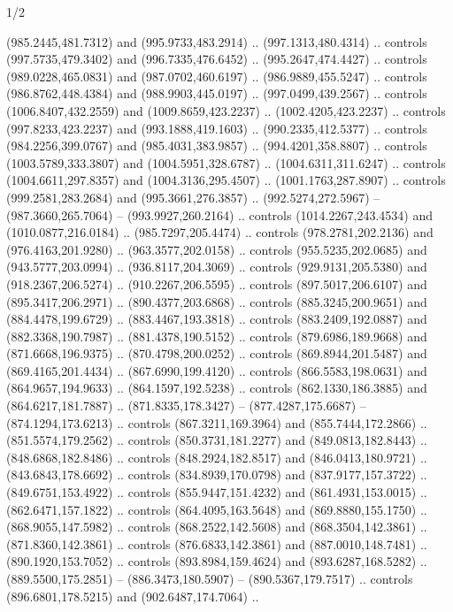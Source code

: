 \begin{flagdescription}{1/2}
\begin{scope}[shift={(2*\flaglength/3-0.25*\rb,0.51333\flagwidth)},scale=0.001715\flagwidth*\stretchfactor]
\begin{scope}[y=-1pt, x=1pt,cm={{1.04354,0.0,0.0,1.01818,(-827,-297)}}]
\begin{scope}[draw=black,line width=0.015\flagwidth]
\begin{scope}[fill=gold]
  (985.2445,481.7312) and (995.9733,483.2914) .. (997.1313,480.4314) .. controls
  (997.5735,479.3402) and (996.7335,476.6452) .. (995.2647,474.4427) .. controls
  (989.0228,465.0831) and (987.0702,460.6197) .. (986.9889,455.5247) .. controls
  (986.8762,448.4384) and (988.9903,445.0197) .. (997.0499,439.2567) .. controls
  (1006.8407,432.2559) and (1009.8659,423.2237) .. (1002.4205,423.2237) ..
  controls (997.8233,423.2237) and (993.1888,419.1603) .. (990.2335,412.5377) ..
  controls (984.2256,399.0767) and (985.4031,383.9857) .. (994.4201,358.8807) ..
  controls (1003.5789,333.3807) and (1004.5951,328.6787) .. (1004.6311,311.6247)
  .. controls (1004.6611,297.8357) and (1004.3136,295.4507) ..
  (1001.1763,287.8907) .. controls (999.2581,283.2684) and (995.3661,276.3857)
  .. (992.5274,272.5967) -- (987.3660,265.7064) -- (993.9927,260.2164) ..
  controls (1014.2267,243.4534) and (1010.0877,216.0184) .. (985.7297,205.4474)
  .. controls (978.2781,202.2136) and (976.4163,201.9280) .. (963.3577,202.0158)
  .. controls (955.5235,202.0685) and (943.5777,203.0994) .. (936.8117,204.3069)
  .. controls (929.9131,205.5380) and (918.2367,206.5274) .. (910.2267,206.5595)
  .. controls (897.5017,206.6107) and (895.3417,206.2971) .. (890.4377,203.6868)
  .. controls (885.3245,200.9651) and (884.4478,199.6729) .. (883.4467,193.3818)
  .. controls (883.2409,192.0887) and (882.3368,190.7987) .. (881.4378,190.5152)
  .. controls (879.6986,189.9668) and (871.6668,196.9375) .. (870.4798,200.0252)
  .. controls (869.8944,201.5487) and (869.4165,201.4434) .. (867.6990,199.4120)
  .. controls (866.5583,198.0631) and (864.9657,194.9633) .. (864.1597,192.5238)
  .. controls (862.1330,186.3885) and (864.6217,181.7887) .. (871.8335,178.3427)
  -- (877.4287,175.6687) -- (874.1294,173.6213) .. controls (867.3211,169.3964)
  and (855.7444,172.2866) .. (851.5574,179.2562) .. controls (850.3731,181.2277)
  and (849.0813,182.8443) .. (848.6868,182.8486) .. controls (848.2924,182.8517)
  and (846.0413,180.9721) .. (843.6843,178.6692) .. controls (834.8939,170.0798)
  and (837.9177,157.3722) .. (849.6751,153.4922) .. controls (855.9447,151.4232)
  and (861.4931,153.0015) .. (862.6471,157.1822) .. controls (864.4095,163.5648)
  and (869.8880,155.1750) .. (868.9055,147.5982) .. controls (868.2522,142.5608)
  and (868.3504,142.3861) .. (871.8360,142.3861) .. controls (876.6833,142.3861)
  and (887.0010,148.7481) .. (890.1920,153.7052) .. controls (893.8984,159.4624)
  and (893.6287,168.5282) .. (889.5500,175.2851) -- (886.3473,180.5907) --
  (890.5367,179.7517) .. controls (896.6801,178.5215) and (902.6487,174.7064) ..

\end{scope}
\end{scope}
\end{scope}
\end{scope}
\end{flagdescription}
